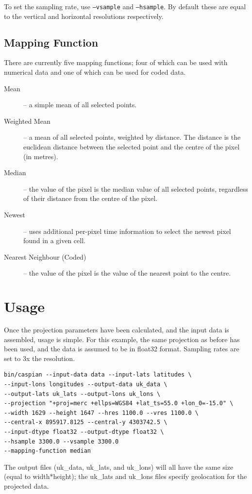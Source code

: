 \documentclass[a4paper,12pt]{article}
\begin{document}
To set the sampling rate, use \texttt{--vsample} and \texttt{--hsample}. By default these are equal to the vertical and horizontal resolutions respectively.

\subsection{Mapping Function}
There are currently five mapping functions; four of which can be used with numerical data and one of which can be used for coded data.
\begin{description}
\item[Mean] -- a simple mean of all selected points.
\item[Weighted Mean] -- a mean of all selected points, weighted by distance. The distance is the euclidean distance between the selected point and the centre of the pixel (in metres).
\item[Median] -- the value of the pixel is the median value of all selected points, regardless of their distance from the centre of the pixel.
\item[Newest] -- uses additional per-pixel time information to select the newest pixel found in a given cell.
\item[Nearest Neighbour (Coded)] -- the value of the pixel is the value of the nearest point to the centre.
\end{description}


\section{Usage}

Once the projection parameters have been calculated, and the input data is assembled, usage is simple. For this example, the same projection as before has been used, and the data is assumed to be in float32 format. Sampling rates are set to 3x the resolution.
\begin{verbatim}
bin/caspian --input-data data --input-lats latitudes \
--input-lons longitudes --output-data uk_data \
--output-lats uk_lats --output-lons uk_lons \
--projection "+proj=merc +ellps=WGS84 +lat_ts=55.0 +lon_0=-15.0" \
--width 1629 --height 1647 --hres 1100.0 --vres 1100.0 \
--central-x 895917.8125 --central-y 4303742.5 \
--input-dtype float32 --output-dtype float32 \
--hsample 3300.0 --vsample 3300.0
--mapping-function median
\end{verbatim}

The output files (uk\_data, uk\_lats, and uk\_lons) will all have the same size (equal to width*height); the uk\_lats and uk\_lons files specify geolocation for the projected data.
\end{document}
